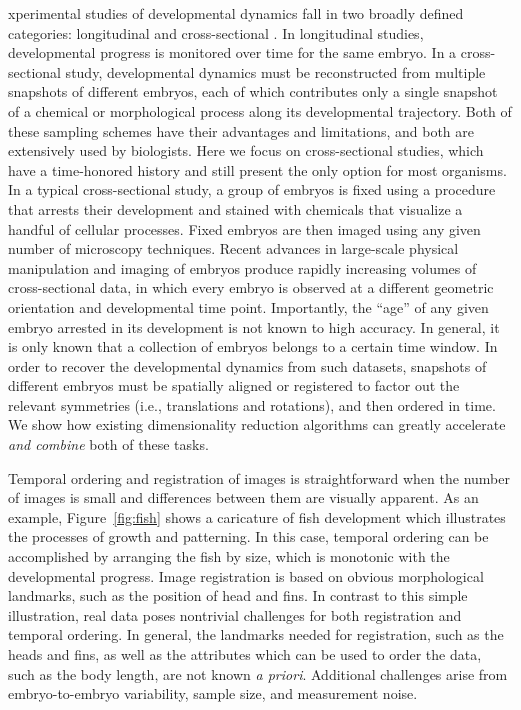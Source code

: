 \documentclass{pnastwo}
\begin{document}
\begin{article}
xperimental studies of developmental dynamics fall in two broadly defined categories: longitudinal and cross-sectional \cite{diggle2002analysis}.
%
In longitudinal studies, developmental progress is monitored over time for the same embryo.
%
In a cross-sectional study, developmental dynamics must be reconstructed from multiple snapshots of different embryos, each of which contributes only a single snapshot of a chemical or morphological process along its developmental trajectory.
%
Both of these sampling schemes have their advantages and limitations, and both are extensively used by biologists.
%
Here we focus on cross-sectional studies, which have a time-honored history and still present the only option for most organisms.
%
In a typical cross-sectional study, a group of embryos is fixed using a procedure that arrests their development and stained with chemicals that visualize a handful of cellular processes.
%
Fixed embryos are then imaged using any given number of microscopy techniques.
%
Recent advances in large-scale physical manipulation and imaging of embryos produce rapidly increasing volumes of cross-sectional data, in which every embryo is observed at a different geometric orientation and developmental time point.
%
Importantly, the ``age'' of any given embryo arrested in its development is not known to high accuracy.
%
In general, it is only known that a collection of embryos belongs to a certain time window.
%
In order to recover the developmental dynamics from such datasets, snapshots of different embryos must be spatially aligned or registered to factor out the relevant symmetries (i.e., translations and rotations), and then ordered in time.
%
We show how existing dimensionality reduction algorithms can greatly accelerate {\it and combine} both of these tasks.

Temporal ordering and registration of images is straightforward when the number of images is small and differences between them are visually apparent.
%
As an example, Figure~\ref{fig:fish} shows a caricature of fish development which illustrates the processes of growth and patterning.
%
In this case, temporal ordering can be accomplished by arranging the fish by size, which is monotonic with the developmental progress.
%
Image registration is based on obvious morphological landmarks, such as the position of head and fins.
%
In contrast to this simple illustration, real data poses nontrivial challenges for both registration and temporal ordering. 
%
In general, the landmarks needed for registration, such as the heads and fins, as well as the attributes which can be used to order the data, such as the body length, are not known {\it a priori}.
%
Additional challenges arise from embryo-to-embryo variability, sample size, and measurement noise. 


\end{article}
\end{document}
